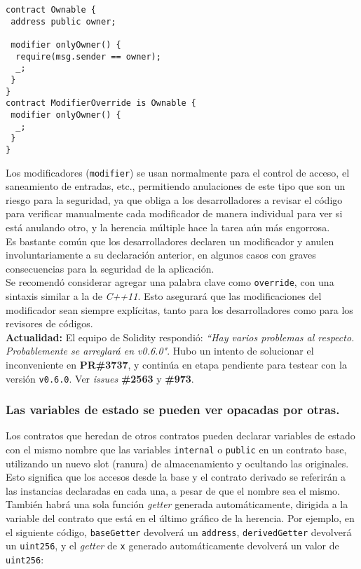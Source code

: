 \begin{lstlisting}[language=Solidity, caption={Código ejemplo \textit{override} de modificador}]
contract Ownable {
 address public owner;
  
 modifier onlyOwner() {
  require(msg.sender == owner);
  _;
 }
}
contract ModifierOverride is Ownable { 
 modifier onlyOwner() {
  _;
 }
}
\end{lstlisting}

Los modificadores (\texttt{modifier}) se usan normalmente para el control de acceso, el saneamiento de entradas, etc., permitiendo anulaciones de este tipo que son un riesgo para la seguridad, ya que obliga a los desarrolladores a revisar el código para verificar manualmente cada modificador de manera individual para ver si está anulando otro, y la herencia múltiple hace la tarea aún más engorrosa.\\

Es bastante común que los desarrolladores declaren un modificador y anulen involuntariamente a su declaración anterior, en algunos casos con graves consecuencias para la seguridad de la aplicación.\\

Se recomendó considerar agregar una palabra clave como \texttt{override}, con una sintaxis similar a la de \textit{C++11}\cite{CppReferenceOverride}. Esto asegurará que las modificaciones del modificador sean siempre explícitas, tanto para los desarrolladores como para los revisores de códigos.\\

\textbf{Actualidad:} El equipo de Solidity respondió: \textit{``Hay varios problemas al respecto. Probablemente se arreglará en v0.6.0"}. Hubo un intento de solucionar el inconveniente en \textbf{PR\#3737}\cite{GHPR3737}, y continúa en etapa pendiente para testear con la versión \texttt{v0.6.0}. Ver \textit{issues} \textbf{\#2563}\cite{GHI2563} y \textbf{\#973}\cite{GHI973}.\\

\subsubsection{Las variables de estado se pueden ver opacadas por otras.}

Los contratos que heredan de otros contratos pueden declarar variables de estado con el mismo nombre que las variables \texttt{internal} o \texttt{public} en un contrato base, utilizando un nuevo slot (ranura) de almacenamiento y ocultando las originales. Esto significa que los accesos desde la base y el contrato derivado se referirán a las instancias declaradas en cada una, a pesar de que el nombre sea el mismo. También habrá una sola función \textit{getter} generada automáticamente, dirigida a la variable del contrato que está en el último gráfico de la herencia. Por ejemplo, en el siguiente código, \texttt{baseGetter} devolverá un \texttt{address}, \texttt{derivedGetter} devolverá un \texttt{uint256}, y el \textit{getter} de \texttt{x} generado automáticamente devolverá un valor de \texttt{uint256}:

